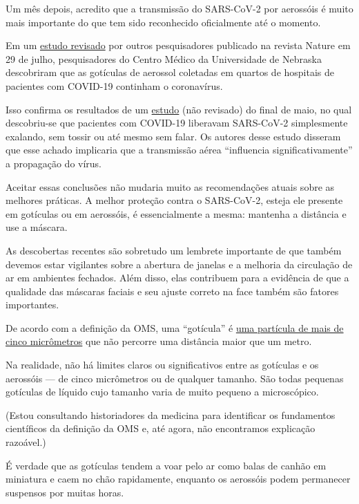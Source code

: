 Um mês depois, acredito que a transmissão do SARS-CoV-2 por aerossóis é
muito mais importante do que tem sido reconhecido oficialmente até o
momento.

Em um \href{https://www.nature.com/articles/s41598-020-69286-3}{estudo
revisado} por outros pesquisadores publicado na revista Nature em 29 de
julho, pesquisadores do Centro Médico da Universidade de Nebraska
descobriram que as gotículas de aerossol coletadas em quartos de
hospitais de pacientes com COVID-19 continham o coronavírus.

Isso confirma os resultados de um
\href{https://www.medrxiv.org/content/10.1101/2020.05.31.20115154v1}{estudo}
(não revisado) do final de maio, no qual descobriu-se que pacientes com
COVID-19 liberavam SARS-CoV-2 simplesmente exalando, sem tossir ou até
mesmo sem falar. Os autores desse estudo disseram que esse achado
implicaria que a transmissão aérea ``influencia significativamente'' a
propagação do vírus.

Aceitar essas conclusões não mudaria muito as recomendações atuais sobre
as melhores práticas. A melhor proteção contra o SARS-CoV-2, esteja ele
presente em gotículas ou em aerossóis, é essencialmente a mesma:
mantenha a distância e use a máscara.

As descobertas recentes são sobretudo um lembrete importante de que
também devemos estar vigilantes sobre a abertura de janelas e a melhoria
da circulação de ar em ambientes fechados. Além disso, elas contribuem
para a evidência de que a qualidade das máscaras faciais e seu ajuste
correto na face também são fatores importantes.

De acordo com a definição da OMS, uma ``gotícula'' é
\href{https://www.who.int/news-room/commentaries/detail/modes-of-transmission-of-virus-causing-covid-19-implications-for-ipc-precaution-recommendations}{uma
partícula de mais de cinco micrômetros} que não percorre uma distância
maior que um metro.

Na realidade, não há limites claros ou significativos entre as gotículas
e os aerossóis --- de cinco micrômetros ou de qualquer tamanho. São
todas pequenas gotículas de líquido cujo tamanho varia de muito pequeno
a microscópico.

(Estou consultando historiadores da medicina para identificar os
fundamentos científicos da definição da OMS e, até agora, não
encontramos explicação razoável.)

É verdade que as gotículas tendem a voar pelo ar como balas de canhão em
miniatura e caem no chão rapidamente, enquanto os aerossóis podem
permanecer suspensos por muitas horas.

